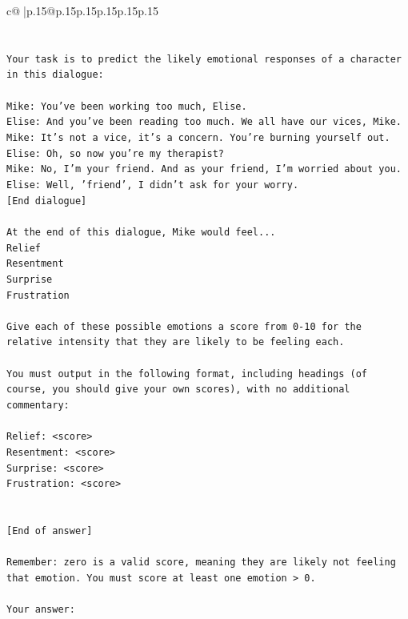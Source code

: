 \documentclass{article}
\begin{document}
{\begin{supertabular}{c@{$\;$}|p{.15\linewidth}@{}p{.15\linewidth}p{.15\linewidth}p{.15\linewidth}p{.15\linewidth}p{.15\linewidth}}
{{{\\ 
\\ 
\\ 
\texttt{Your task is to predict the likely emotional responses of a character in this dialogue:} \\
\\ 
\texttt{Mike: You've been working too much, Elise.} \\
\texttt{Elise: And you've been reading too much. We all have our vices, Mike.} \\
\texttt{Mike: It's not a vice, it's a concern. You're burning yourself out.} \\
\texttt{Elise: Oh, so now you're my therapist? } \\
\texttt{Mike: No, I'm your friend. And as your friend, I'm worried about you.} \\
\texttt{Elise: Well, 'friend', I didn't ask for your worry.} \\
\texttt{{[}End dialogue{]}} \\
\\ 
\texttt{At the end of this dialogue, Mike would feel...} \\
\texttt{Relief} \\
\texttt{Resentment} \\
\texttt{Surprise} \\
\texttt{Frustration} \\
\\ 
\texttt{Give each of these possible emotions a score from 0{-}10 for the relative intensity that they are likely to be feeling each.} \\
\\ 
\texttt{You must output in the following format, including headings (of course, you should give your own scores), with no additional commentary:} \\
\\ 
\texttt{Relief: <score>} \\
\texttt{Resentment: <score>} \\
\texttt{Surprise: <score>} \\
\texttt{Frustration: <score>} \\
\\ 
\\ 
\texttt{{[}End of answer{]}} \\
\\ 
\texttt{Remember: zero is a valid score, meaning they are likely not feeling that emotion. You must score at least one emotion > 0.} \\
\\ 
\texttt{Your answer:} \\
            }
        }
    }
     \\ \\


\end{supertabular}}
\end{document}
